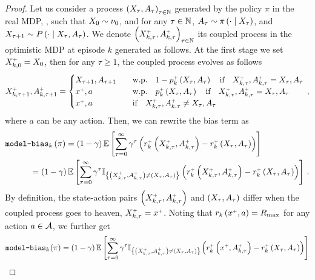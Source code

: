 \begin{proof}
    Let us consider a process  $\left( X_\tau, A_\tau \right)_{\tau \in \mathbb{N}}$ generated by the policy $\pi$ in the real MDP, \ie, such that $X_0 \sim \nu_0$, and for any $\tau \in \mathbb{N}$, $A_\tau \sim \pi \left( \cdot \mathrel{}\middle|\mathrel{} X_\tau \right)$, and $X_{\tau+1} \sim P \left( \cdot \mathrel{}\middle|\mathrel{} X_\tau, A_\tau \right)$. We denote $\left( X^{\mathsf{\scriptscriptstyle +}}_{k, \tau}, A^{\mathsf{\scriptscriptstyle +}}_{k, \tau} \right)_{\tau \in \mathbb{N}}$ its coupled process in the optimistic MDP at episode $k$ generated as follows. At the first stage we set $X^{\mathsf{\scriptscriptstyle +}}_{k, 0} = X_0$, then for any $\tau \geq 1$, the coupled process evolves as follows
    \begin{equation*}
        X^{\mathsf{\scriptscriptstyle +}}_{k, \tau+1}, A^{\mathsf{\scriptscriptstyle +}}_{k, \tau+1} =
        \begin{cases}
            X_{\tau+1}, A_{\tau+1} \quad &\text{w.p.} \quad 1 - p^{\mathsf{\scriptscriptstyle +}}_k \left( X_\tau, A_\tau \right) \quad \text{if} \quad  X^{\mathsf{\scriptscriptstyle +}}_{k, \tau}, A^{\mathsf{\scriptscriptstyle +}}_{k, \tau} = X_\tau, A_\tau \\
            x^{\mathsf{\scriptscriptstyle +}}, a \quad & \text{w.p.} \quad p^{\mathsf{\scriptscriptstyle +}}_k \left( X_\tau, A_\tau \right) \quad \text{if} \quad  X^{\mathsf{\scriptscriptstyle +}}_{k, \tau}, A^{\mathsf{\scriptscriptstyle +}}_{k, \tau} = X_\tau, A_\tau \\
            x^{\mathsf{\scriptscriptstyle +}}, a \quad & \text{if} \quad X^{\mathsf{\scriptscriptstyle +}}_{k, \tau}, A^{\mathsf{\scriptscriptstyle +}}_{k, \tau} \neq X_\tau, A_\tau
        \end{cases}\,,
    \end{equation*}
    where $a$ can be any action. Then, we can rewrite the bias term as
    \begin{align*}
        &\texttt{model-bias}_k \left( \pi \right) = \left( 1 - \gamma \right) \mathbb{E} \left[ \sum_{\tau=0}^\infty \gamma^\tau \left( r_k^{\mathsf{\scriptscriptstyle +}} \left( X^{\mathsf{\scriptscriptstyle +}}_{k, \tau}, A^{\mathsf{\scriptscriptstyle +}}_{k, \tau} \right) - r_k^{\mathsf{\scriptscriptstyle +}} \left( X_\tau, A_\tau \right) \right) \right] \\
        &\quad\quad\quad= \left( 1 - \gamma \right) \mathbb{E} \left[ \sum_{\tau=0}^\infty \gamma^\tau \mathbb{I}_{\left\{\left( X^{\mathsf{\scriptscriptstyle +}}_{k, \tau}, A^{\mathsf{\scriptscriptstyle +}}_{k, \tau} \right) \neq \left( X_\tau, A_\tau \right)\right\}} \left( r_k^{\mathsf{\scriptscriptstyle +}} \left( X^{\mathsf{\scriptscriptstyle +}}_{k, \tau}, A^{\mathsf{\scriptscriptstyle +}}_{k, \tau} \right) - r_k^{\mathsf{\scriptscriptstyle +}} \left( X_\tau, A_\tau \right) \right) \right]\,.
    \end{align*}
    By definition, the state-action pairs $\left( X^{\mathsf{\scriptscriptstyle +}}_{k, \tau}, A^{\mathsf{\scriptscriptstyle +}}_{k, \tau} \right)$ and $\left( X_\tau, A_\tau \right)$ differ when the coupled process goes to heaven, \ie $X^{\mathsf{\scriptscriptstyle +}}_{k, \tau} = x^{\mathsf{\scriptscriptstyle +}}$. Noting that $r_k \left( x^{\mathsf{\scriptscriptstyle +}}, a \right) = R_{\max}$ for any action $a \in \mathcal{A}$, we further get
    \begin{align*}
        \modelbias_k \hspace{-1pt}\spr{\pi} &= \spr{1 - \gamma} \bbE \sbr{\sum_{\tau=0}^\infty \gamma^\tau \II{\spr{X^\upplus_{k, \tau}, A^\upplus_{k, \tau}} \neq \spr{X_\tau, A_\tau}} \hspace{-1pt}\spr{r_k^\upplus \spr{x^\upplus, A^\upplus_{k, \tau}} - r_k^\upplus \spr{X_\tau, A_\tau}}} \\

\end{align*}
\end{proof}
